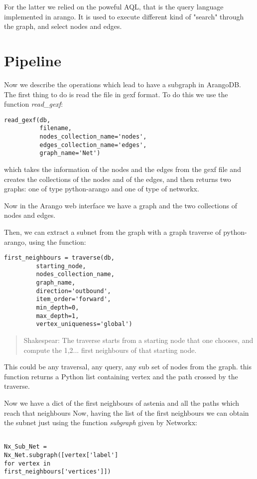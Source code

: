 \documentclass[11pt,twocolumn]{article}
\begin{document}
For the latter we relied on the poweful AQL, that is the query language implemented in arango. It is used to execute different kind of "search" through the graph, and select nodes and edges.


\section{Pipeline}

Now we describe the operations which lead to have a subgraph in ArangoDB.
The first thing to do is read the file in gexf format.
To do this we use the function \textit{read\_gexf}:
\begin{verbatim}
read_gexf(db, 
          filename,
          nodes_collection_name='nodes', 
          edges_collection_name='edges',
          graph_name='Net')
\end{verbatim}
which takes the information of the nodes and the edges from the gexf file and creates the collections of the nodes and of the edges, and then returns two graphs: one of type python-arango and one of type of networkx.

Now in the Arango web interface we have a graph and the two collections of nodes and edges.


Then, we can extract a subnet from the graph with a graph traverse of python-arango, using the function:
\begin{verbatim}
first_neighbours = traverse(db, 
         starting_node,
         nodes_collection_name,
         graph_name,
         direction='outbound',
         item_order='forward',
         min_depth=0,
         max_depth=1,
         vertex_uniqueness='global')
\end{verbatim}

\begin{quote}{Shakespear:}
The traverse starts from a starting node that one chooses, and compute the 1,2... first neighbours of that starting node.
\end{quote} 
This could be any traversal, any query, any sub set of nodes from the graph.
this function returns a Python list containing vertex and the path crossed by the traverse.

Now we have a dict of the first neighbours of astenia and all the paths which reach that neighbours
Now, having the list of the first neighbours we can obtain the subnet just using the function \textit{subgraph} given by Networkx:
\begin{verbatim}

Nx_Sub_Net = 
Nx_Net.subgraph([vertex['label'] 
for vertex in 
first_neighbours['vertices']])
\end{verbatim}
\end{document}
